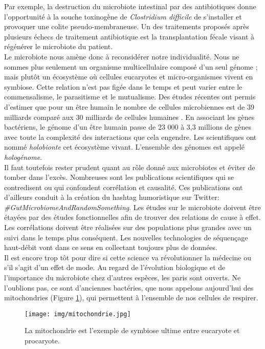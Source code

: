 \documentclass[12pt,a4paper]{article}
\begin{document}
Par exemple, la destruction du microbiote intestinal par des antibiotiques donne l'opportunité à la souche toxinogène de \textit{Clostridium difficile} de s'installer et provoquer une colite pseudo-membraneuse. Un des traitements proposés après plusieurs échecs de traitement antibiotique est la transplantation fécale visant à régénérer le microbiote du patient. \\
Le microbiote nous amène donc à reconsidérer notre individualité. Nous ne sommes plus seulement un organisme multicellulaire composé d'un seul génome ; mais plutôt un écosystème où cellules eucaryotes et micro-organismes vivent en symbiose. Cette relation n'est pas figée dans le temps et peut varier entre le commensalisme, le parasitisme et le mutualisme. Des études récentes ont permis d'estimer que pour un être humain le nombre de cellules microbiennes est de 39 milliards comparé aux 30 milliards de cellules humaines \cite{Sender2016}. En associant les gènes bactériens, le génome d’un être humain passe de 23 000  à 3,3 millions de gènes \cite{Qin2010} avec toute la complexité des interactions que cela engendre. Les scientifiques ont nommé \textit{holobionte} cet écosystème vivant. L'ensemble des génomes est appelé \textit{hologénome}. \\
Il faut toutefois rester prudent quant au rôle donné aux microbiotes et éviter de tomber dans l'excès. Nombreuses sont les publications scientifiques qui se contredisent ou qui confondent corrélation et causalité. Ces publications ont d'ailleurs conduit à la création du hashtag humoristique sur Twitter: \textit{\#GutMicrobiomeAndRandomSomething}.
Les études sur le microbiote doivent être étayées par des études fonctionnelles afin de trouver des relations de cause à effet. Les corrélations doivent être réalisées sur des populations plus grandes avec un suivi dans le temps plus conséquent. Les nouvelles technologies de séquençage haut-débit vont dans ce sens en collectant toujours plus de données.\\
Il est encore trop tôt pour dire si cette science va révolutionner la médecine ou s’il s'agit d'un effet de mode. Au regard de l'évolution biologique et de l'importance du microbiote chez d'autres espèces, les paris sont ouverts. Ne l'oublions pas, ce sont d'anciennes bactéries, que nous appelons aujourd'hui des mitochondries (Figure \ref{mitochondrie}), qui permettent à l'ensemble de nos cellules de respirer.

\begin{figure}[ht]
\begin{center}
\texttt{[image: img/mitochondrie.jpg]}\hfill
\end{center}
\caption{La mitochondrie est l'exemple de symbiose ultime entre eucaryote et procaryote.}
\label{mitochondrie}
\end{figure}
\end{document}
